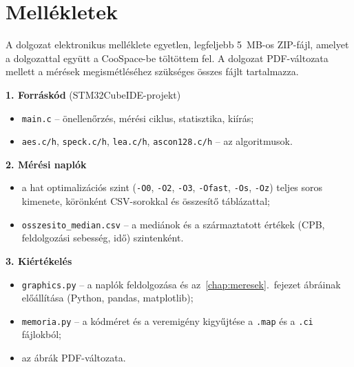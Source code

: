 \documentclass[a4paper,12pt]{report}
\theoremstyle{definition}
\theoremstyle{remark}
\begin{document}
\chapter*{Mellékletek}

A dolgozat elektronikus melléklete egyetlen, legfeljebb 5~MB-os ZIP-fájl, amelyet a dolgozattal együtt a CooSpace-be töltöttem fel. A dolgozat PDF-változata mellett a mérések megismétléséhez szükséges összes fájlt tartalmazza.

\medskip
\noindent\textbf{1. Forráskód} (STM32CubeIDE-projekt)
\begin{itemize}
	\item \texttt{main.c} -- önellenőrzés, mérési ciklus, statisztika, kiírás;
	\item \texttt{aes.c/h}, \texttt{speck.c/h}, \texttt{lea.c/h}, \texttt{ascon128.c/h} -- az algoritmusok.
\end{itemize}

\noindent\textbf{2. Mérési naplók}
\begin{itemize}
	\item a hat optimalizációs szint (\texttt{-O0}, \texttt{-O2}, \texttt{-O3}, \texttt{-Ofast}, \texttt{-Os}, \texttt{-Oz}) teljes soros kimenete, körönként CSV-sorokkal és összesítő táblázattal;
	\item \texttt{osszesito\_median.csv} -- a mediánok és a származtatott értékek (CPB, feldolgozási sebesség, idő) szintenként.
\end{itemize}

\noindent\textbf{3. Kiértékelés}
\begin{itemize}
	\item \texttt{graphics.py} -- a naplók feldolgozása és az~\ref{chap:meresek}.~fejezet ábráinak előállítása (Python, pandas, matplotlib);
	\item \texttt{memoria.py} -- a kódméret és a veremigény kigyűjtése a \texttt{.map} és a \texttt{.ci} fájlokból;
	\item az ábrák PDF-változata.
\end{itemize}
\end{document}
